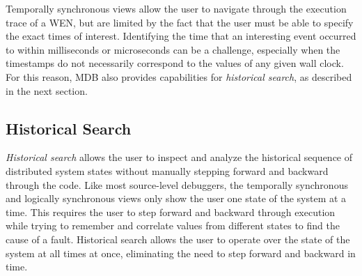Temporally synchronous views allow the user to navigate through the execution
trace of a WEN, but are limited by the fact that the user must be able to
specify the exact times of interest.  Identifying the time that an interesting
event occurred to within milliseconds or microseconds can be a challenge,
especially when the timestamps do not necessarily correspond to the values of
any given wall clock.  For this reason, MDB also provides capabilities for {\em
historical search}, as described in the next section.

\subsection{Historical Search} \label{history}

\emph{Historical search} allows the user to inspect and analyze the historical
sequence of distributed system states without manually stepping forward and
backward through the code.  Like most source-level debuggers, the temporally
synchronous and logically synchronous views only show the user one state of the
system at a time. This requires the user to step forward and backward through
execution while trying to remember and correlate values from different states to
find the cause of a fault.  Historical search allows the user to operate over
the state of the system at all times at once, eliminating the need to step
forward and backward in time.

